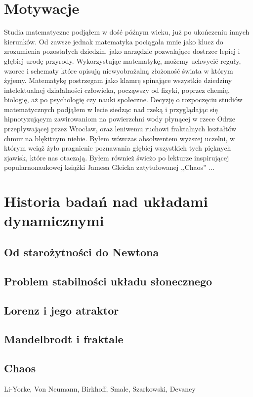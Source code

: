 \documentclass[licencjacka]{pwr_wmat_praca_dyplomowa}
\theoremstyle{plain}
\numberwithin{theorem}{chapter}
\theoremstyle{definition}
\numberwithin{theorem}{chapter}
\begin{document}
\section{Motywacje}
Studia matematyczne podjąłem w dość późnym wieku, już po ukończeniu innych kierunków. Od zawsze jednak matematyka pociągała mnie jako klucz do zrozumienia pozostałych dziedzin, jako narzędzie pozwalające dostrzec lepiej i głębiej urodę przyrody. Wykorzystując matematykę, możemy uchwycić reguły, wzorce i schematy które opisują niewyobrażalną złożoność świata w którym żyjemy. Matematykę postrzegam jako klamrę spinające wszystkie dziedziny intelektualnej działalności człowieka, począwszy od fizyki, poprzez chemię, biologię, aż po psychologię czy nauki społeczne. Decyzję o rozpoczęciu studiów matematycznych podjąłem w lecie siedząc nad rzeką i przyglądając się hipnotyzującym zawirowaniom na powierzchni wody płynącej w rzece Odrze przepływającej przez Wrocław, oraz leniwemu ruchowi fraktalnych kształtów chmur na błękitnym niebie. Byłem wówczas absolwentem wyższej uczelni, w którym wciąż żyło pragnienie poznawania głębiej wszystkich tych pięknych zjawisk, które nas otaczają. Byłem również świeżo po lekturze inspirującej popularnonaukowej książki Jamesa Gleicka zatytułowanej ,,Chaos'' \cite{gleick1987chaos}...
\section{Historia badań nad układami dynamicznymi}

\subsection{Od starożytności do Newtona}
\subsection{Problem stabilności układu słonecznego}
\subsection{Lorenz i jego atraktor}
\subsection{Mandelbrodt i fraktale}
\subsection{Chaos}
Li-Yorke, Von Neumann, Birkhoff, Smale, Szarkowski, Devaney
\end{document}
